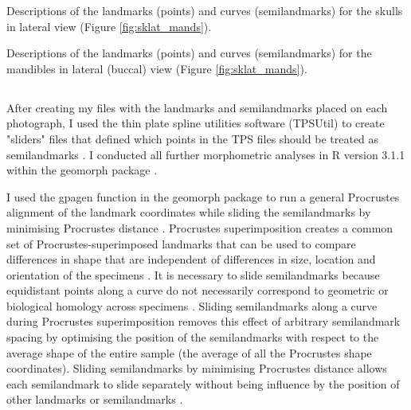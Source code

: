 \begin{table}[!htb]
\caption[Skulls: lateral landmarks]
		{Descriptions of the landmarks (points) and curves (semilandmarks) for the skulls in lateral view (Figure \ref{fig:sklat_mands}).} 

\label{tab:sklat}
\end{table}

\begin{table}[!htb]			
	\centering
	\caption[Mandibles: landmarks]
		{Descriptions of the landmarks (points) and curves (semilandmarks) for the mandibles in lateral (buccal) view (Figure \ref{fig:sklat_mands}).}
	
	\label{tab:mands} 
\end{table}


\newpage
\subsection{}
\label{sect:procrustes}

	After creating my files with the landmarks and semilandmarks placed on each photograph, I used the thin plate spline utilities software (TPSUtil) \citep{Rohlf2012} to create "sliders" files that defined which points in the TPS files should be treated as semilandmarks \citep{Zelditch2012}. I conducted all further morphometric analyses in R version 3.1.1 \citep{Team2014} within the geomorph package \citep{Adams2013}.

	
	I used the gpagen function in the geomorph package \citep{Adams2013} to run a general Procrustes alignment \citep{Rohlf1993} of the landmark coordinates while sliding the semilandmarks by minimising Procrustes distance \citep{Bookstein1997}. Procrustes superimposition creates a common set of Procrustes-superimposed landmarks that can be used to compare differences in shape that are independent of differences in size, location and orientation of the specimens \citep{Webster2010}. It is necessary to slide semilandmarks because equidistant points along a curve do not necessarily correspond to geometric or biological homology across specimens \citep{Gunz2013}. Sliding semilandmarks along a curve during Procrustes superimposition removes this effect of arbitrary semilandmark spacing by optimising the position of the semilandmarks with respect to the average shape of the entire sample (the average of all the Procrustes shape coordinates). Sliding semilandmarks by minimising Procrustes distance \citep[the sum of squared distances between corresponding points of two Procrustes-superimposed shapes,][]{Zelditch2012} allows each semilandmark to slide separately without being influence by the position of other landmarks or semilandmarks \citep{Gunz2013}. 
	
